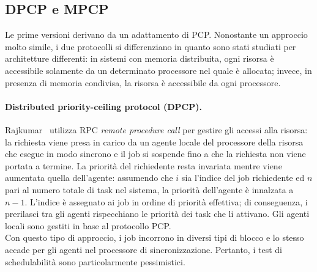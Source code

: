 \subsection{DPCP e MPCP}
\label{sec:lockProtocols.dpcp.mpcp}

Le prime versioni derivano da un adattamento di PCP. Nonostante un approccio molto simile, i due protocolli si differenziano in quanto sono stati studiati per architetture differenti: in sistemi con memoria distribuita, ogni risorsa è accessibile solamente da un determinato processore nel quale è allocata; invece, in presenza di memoria condivisa, la risorsa è accessibile da ogni processore.

\paragraph{Distributed priority-ceiling protocol (DPCP).} Rajkumar~\cite{Rajkumar:1991:SRS:532621} utilizza RPC \textit{remote procedure call} per gestire gli accessi alla risorsa: la richiesta viene presa in carico da un agente locale del processore della risorsa che esegue in modo sincrono e il job si sospende fino a che la richiesta non viene portata a termine. La priorità del richiedente resta invariata mentre viene aumentata quella dell'agente: assumendo che $i$ sia l'indice del job richiedente ed $n$ pari al numero totale di task nel sistema, la priorità dell'agente è innalzata a $n - 1$. L'indice è assegnato ai job in ordine di priorità effettiva; di conseguenza, i prerilasci tra gli agenti rispecchiano le priorità dei task che li attivano. Gli agenti locali sono gestiti in base al protocollo PCP.\\

Con questo tipo di approccio, i job incorrono in diversi tipi di blocco e lo stesso accade per gli agenti nel processore di sincronizzazione. Pertanto, i test di schedulabilità sono particolarmente pessimistici.

